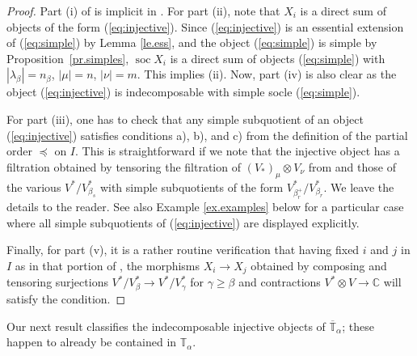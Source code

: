 \documentclass[11pt]{article}
\theoremstyle{plain}
\theoremstyle{nonumberplain}
\theoremstyle{plain}
\theoremstyle{nonumberplain}
\newtheorem{proof}{Proof}
\newcommand\bC{\mathbb C}
\newcommand\bT{\mathbb T}
\DeclareMathOperator{\soc}{\mathrm{soc}}
\begin{document}
\begin{proof}
  Part (i) of  is implicit in .  For part (ii), note that $X_i$ is a direct sum of objects of the form (\ref{eq:injective}).  Since (\ref{eq:injective}) is an essential extension of (\ref{eq:simple}) by Lemma \ref{le.ess}, and the object (\ref{eq:simple}) is simple by Proposition~\ref{pr.simples}, $\soc X_i$ is a direct sum of objects (\ref{eq:simple}) with $\left|\lambda_\beta\right|=n_\beta$, $|\mu|=n$, $|\nu|=m$.  This implies (ii).  Now, part (iv) is also clear as the object (\ref{eq:injective}) is indecomposable with simple socle (\ref{eq:simple}). 
  
  For part (iii), one has to check that any simple subquotient of an object (\ref{eq:injective}) satisfies conditions a), b), and c) from the definition of the partial order $\preceq$ on $I$.  This is straightforward if we note that the injective object  has a filtration obtained by tensoring the filtration of
$(V_*)_\mu\otimes V_\nu$ from \cite[Theorem 2.2]{PS} and those of the
various $V^*/V^*_{\beta_s}$ with simple subquotients of the form
$V^*_{\beta^+_r}/V^*_{\beta_r}$.   We leave the details to the reader.  See also Example \ref{ex.examples} below for a particular case where all simple subquotients of (\ref{eq:injective}) are displayed explicitly.
%
%

  Finally, for part (v), it is a rather routine verification that having
  fixed $i$ and $j$ in $I$ as in that portion of ,
  the morphisms $X_i\to X_j$ obtained by composing and tensoring
  surjections $V^*/V^*_\beta\to V^*/V^*_\gamma$ for $\gamma\ge \beta$
  and contractions $V^*\otimes V\to \bC$ will satisfy the condition.
\end{proof}



Our next result classifies the indecomposable injective objects of
$\overline{\bT}_\alpha${; these happen to already be contained in $\bT_\alpha$}.
\end{document}

